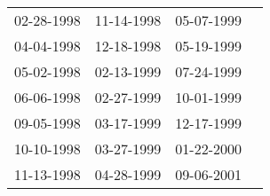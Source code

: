 \begin{supertabular}{llll}
 02-28-1998 &  11-14-1998 &  05-07-1999 \\
 04-04-1998 &  12-18-1998 &  05-19-1999 \\
 05-02-1998 &  02-13-1999 &  07-24-1999 \\
 06-06-1998 &  02-27-1999 &  10-01-1999 \\
 09-05-1998 &  03-17-1999 &  12-17-1999 \\
 10-10-1998 &  03-27-1999 &  01-22-2000 \\
 11-13-1998 &  04-28-1999 &  09-06-2001 \\
\end{supertabular}
